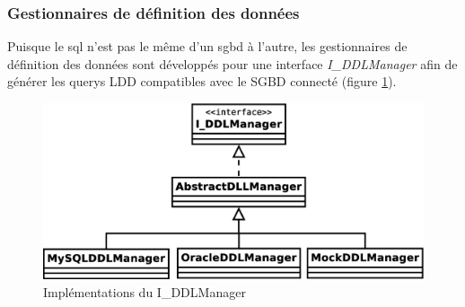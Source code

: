 \subsubsection{Gestionnaires de définition des données}
Puisque le \gls{sql} n'est pas le même d'un \gls{sgbd} à l'autre,
les gestionnaires de définition des données sont développés pour une interface \textit{I\_DDLManager} afin de générer les \glspl{query} LDD compatibles avec le SGBD connecté (figure \ref{ddl_managers_uml}).

\begin{figure}[!p]
\centering
\includegraphics[width=14cm]{images/ddl_managers.eps}
\caption{Implémentations du I\_DDLManager}
\label{ddl_managers_uml}
\end{figure}
